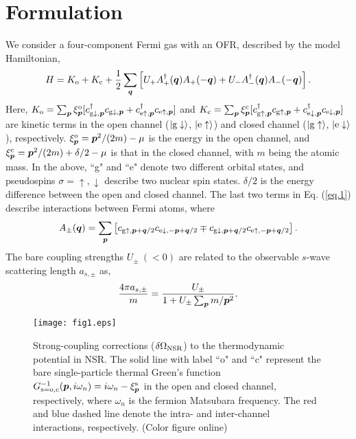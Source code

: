\documentclass[a4paper]{jpconf}
\begin{document}
\section{Formulation}
\par
We consider a four-component Fermi gas with an OFR, described by the model Hamiltonian\cite{Zhang,Junjin},
\begin{equation}
H=K_{\rm o}+K_{\rm c}
+{1 \over 2}\sum_{\bm q}
\left[
U_+A_+^\dagger({\bm q})A_+(-{\bm q})
+
U_-A_-^\dagger({\bm q})A_-(-{\bm q})
\right].
\label{eq.1}
\end{equation}
Here, $K_{\rm o}=\sum_{\bm p}\xi_{\bm p}^{\rm o}[c_{{\rm g}\downarrow,{\bm p}}^\dagger c_{{\rm g}\downarrow,{\bm p}}+c_{{\rm e}\uparrow,{\bm p}}^\dagger c_{{\rm e}\uparrow,{\bm p}}]$ and $K_{\rm c}=\sum_{\bm p}\xi_{\bm p}^{\rm c}[c_{{\rm g}\uparrow,{\bm p}}^\dagger c_{{\rm g}\uparrow,{\bm p}}+c_{{\rm e}\downarrow,{\bm p}}^\dagger c_{{\rm e}\downarrow,{\bm p}}]$ are kinetic terms in the open channel ($|{\rm g}\downarrow\rangle$, $|{\rm e}\uparrow\rangle$) and closed channel ($|{\rm g}\uparrow\rangle$, $|{\rm e}\downarrow\rangle$), respectively. $\xi_{\bm p}^{\rm o}={\bm p}^2/(2m)-\mu$ is the energy in the open channel, and $\xi_{\bm p}^{\rm c}={\bm p}^2/(2m)+\delta/2-\mu$ is that in the closed channel, with $m$ being the atomic mass. In the above, ``g" and ``e" denote two different orbital states, and pseudospins $\sigma=\uparrow,\downarrow$ describe two nuclear spin states. $\delta/2$ is the energy difference between the open and closed channel. The last two terms in Eq. (\ref{eq.1}) describe interactions between Fermi atoms, where 
\begin{equation}
A_\pm({\bm q})=\sum_{\bm p}
\left[
c_{{\rm g}\uparrow,{\bm p}+{\bm q}/2} c_{{\rm e}\downarrow,-{\bm p}+{\bm q}/2}
\mp
c_{{\rm g}\downarrow,{\bm p}+{\bm q}/2} c_{{\rm e}\uparrow,-{\bm p}+{\bm q}/2}
\right].
\label{eq.2}
\end{equation}
The bare coupling strengths $U_\pm~(<0)$ are related to the observable $s$-wave scattering length $a_{s,\pm}$ as,
\begin{equation}
{4\pi a_{s,\pm} \over m}=
{U_\pm \over 1+U_\pm\sum_{\bm p}{m/{\bm p}^2}}.
\label{eq.3}
\end{equation}
\par
\begin{figure}[t]
\center
\texttt{[image: fig1.eps]}
\caption{Strong-coupling corrections ($\delta\Omega_{\rm NSR}$) to the thermodynamic potential in NSR. The solid line with label ``o" and ``c" represent the bare single-particle thermal Green's function $G_{{\rm s}={\rm o,c}}^{-1}({\bm p},i\omega_n)=i\omega_n-\xi_{\bm p}^{\rm s}$ in the open and closed channel, respectively, where $\omega_n$ is the fermion Matsubara frequency. The red and blue dashed line denote the intra- and inter-channel interactions, respectively. (Color figure online)}
\label{fig1}
\end{figure}
\end{document}
